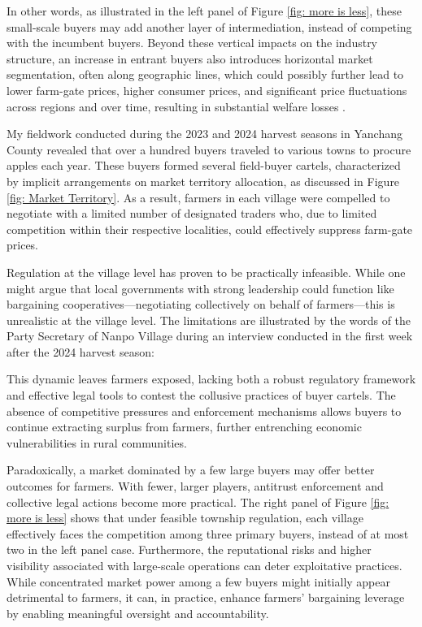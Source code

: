 In other words, as illustrated in the left panel of Figure \ref{fig: more is less}, these small-scale buyers may add another layer of intermediation, instead of competing with the incumbent buyers. Beyond these vertical impacts on the industry structure, an increase in entrant buyers also introduces horizontal market segmentation, often along geographic lines, which could possibly further lead to lower farm-gate prices, higher consumer prices, and significant price fluctuations across regions and over time, resulting in substantial welfare losses \citep{bergquist_McIntosh_2022}.


My fieldwork conducted during the 2023 and 2024 harvest seasons in Yanchang County revealed that over a hundred buyers traveled to various towns to procure apples each year. These buyers formed several field-buyer cartels, characterized by implicit arrangements on market territory allocation, as discussed in Figure \ref{fig: Market Territory}. As a result, farmers in each village were compelled to negotiate with a limited number of designated traders who, due to limited competition within their respective localities, could effectively suppress farm-gate prices.

Regulation at the village level has proven to be practically infeasible. While one might argue that local governments with strong leadership could function like bargaining cooperatives---negotiating collectively on behalf of farmers---this is unrealistic at the village level. The limitations are illustrated by the words of the Party Secretary of Nanpo Village during an interview conducted in the first week after the 2024 harvest season:

\begin{quote}  \end{quote}

This dynamic leaves farmers exposed, lacking both a robust regulatory framework and effective legal tools to contest the collusive practices of buyer cartels. The absence of competitive pressures and enforcement mechanisms allows buyers to continue extracting surplus from farmers, further entrenching economic vulnerabilities in rural communities.


Paradoxically, a market dominated by a few large buyers may offer better outcomes for farmers. With fewer, larger players, antitrust enforcement and collective legal actions become more practical. The right panel of Figure \ref{fig: more is less} shows that under feasible township regulation, each village effectively faces the competition among three primary buyers, instead of at most two in the left panel case. Furthermore, the reputational risks and higher visibility associated with large-scale operations can deter exploitative practices. While concentrated market power among a few buyers might initially appear detrimental to farmers, it can, in practice, enhance farmers' bargaining leverage by enabling meaningful oversight and accountability.

